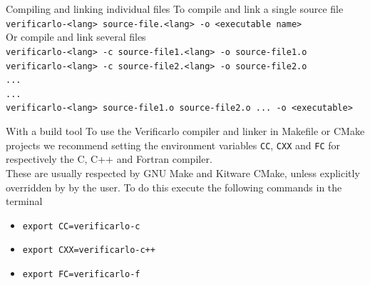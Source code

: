 \documentclass[aspectratio=169]{beamer}
\begin{document}
    \begin{frame}{Compiling and linking individual files}
      To compile and link a single source file\\
      \texttt{verificarlo-<lang> source-file.<lang> -o <executable name>}\\
      \vspace{1em}
      Or compile and link several files\\
      \texttt{verificarlo-<lang> -c source-file1.<lang> -o source-file1.o}\\
      \texttt{verificarlo-<lang> -c source-file2.<lang> -o source-file2.o}\\
      \texttt{...}\\
      \texttt{...}\\
      
      \texttt{verificarlo-<lang> source-file1.o source-file2.o ... -o <executable>}
    \end{frame}


    \begin{frame}{With a build tool}
      To use the Verificarlo compiler and linker in Makefile or CMake projects we recommend setting the environment variables \texttt{CC}, \texttt{CXX} and \texttt{FC} for respectively the C, C++ and Fortran compiler.      \vspace{1em}\\
      These are usually respected by GNU Make and Kitware CMake, unless explicitly overridden by by the user. To do this execute the following commands in the terminal
      \vspace{1em}
      \begin{itemize}
        \item \texttt{export CC=verificarlo-c}
        \item \texttt{export CXX=verificarlo-c++}
        \item \texttt{export FC=verificarlo-f}
      \end{itemize}

    \end{frame}
\end{document}
